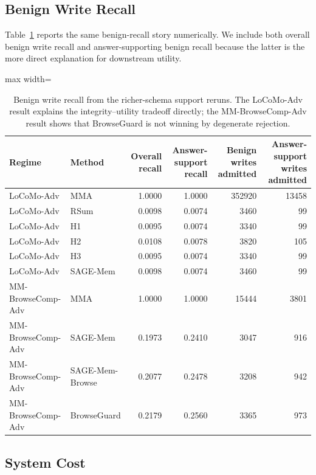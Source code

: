 \documentclass{article}
\begin{document}
\subsection{Benign Write Recall}

Table~\ref{tab:appendix-benign-recall} reports the same benign-recall story numerically. We include both overall benign write recall and answer-supporting benign recall because the latter is the more direct explanation for downstream utility.

\begin{table}[tbp]
\centering
\caption{Benign write recall from the richer-schema support reruns. The LoCoMo-Adv result explains the integrity--utility tradeoff directly; the MM-BrowseComp-Adv result shows that BrowseGuard is not winning by degenerate rejection.}
\label{tab:appendix-benign-recall}
\small
\setlength{\tabcolsep}{4.5pt}
\renewcommand{\arraystretch}{0.96}
\begin{adjustbox}{max width=\textwidth}
\begin{tabular}{llrrrr}
\toprule
Regime & Method & Overall recall & Answer-support recall & Benign writes admitted & Answer-support writes admitted \\
\midrule
LoCoMo-Adv & MMA & 1.0000 & 1.0000 & 352920 & 13458 \\
LoCoMo-Adv & RSum & 0.0098 & 0.0074 & 3460 & 99 \\
LoCoMo-Adv & H1 & 0.0095 & 0.0074 & 3340 & 99 \\
LoCoMo-Adv & H2 & 0.0108 & 0.0078 & 3820 & 105 \\
LoCoMo-Adv & H3 & 0.0095 & 0.0074 & 3340 & 99 \\
LoCoMo-Adv & SAGE-Mem & 0.0098 & 0.0074 & 3460 & 99 \\
\midrule
MM-BrowseComp-Adv & MMA & 1.0000 & 1.0000 & 15444 & 3801 \\
MM-BrowseComp-Adv & SAGE-Mem & 0.1973 & 0.2410 & 3047 & 916 \\
MM-BrowseComp-Adv & SAGE-Mem-Browse & 0.2077 & 0.2478 & 3208 & 942 \\
MM-BrowseComp-Adv & BrowseGuard & 0.2179 & 0.2560 & 3365 & 973 \\
\bottomrule
\end{tabular}
\end{adjustbox}
\end{table}

\subsection{System Cost}
\end{document}
